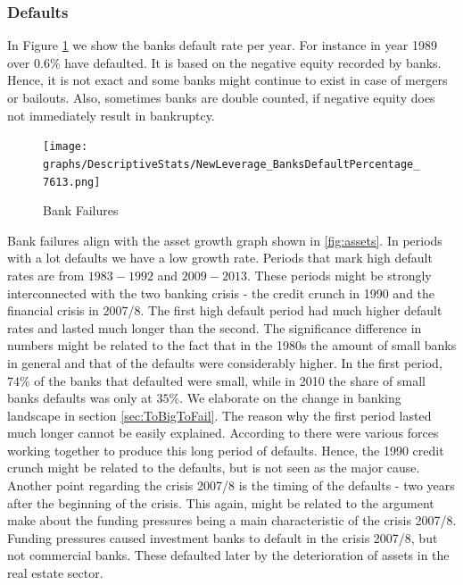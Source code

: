 \documentclass[12pt, a4paper]{article} %
\begin{document}

\subsubsection{Defaults}

In Figure \ref{fig:banks_default} we show the banks default rate per year. For instance in year 1989 over $0.6\%$ have defaulted. It is based on the negative equity recorded by banks. Hence, it is not exact and some banks might continue to exist in case of mergers or bailouts. Also, sometimes banks are double counted, if negative equity does not immediately result in bankruptcy.

\begin{figure}[H]
\texttt{[image: graphs/DescriptiveStats/NewLeverage\_BanksDefaultPercentage\_7613.png]}
\centering
\caption{Bank Failures}
\label{fig:banks_default}
\end{figure}


Bank failures align with the asset growth graph shown in \ref{fig:assets}. In periods with a lot defaults we have a low growth rate. Periods that mark high default rates are from $1983-1992$ and $2009-2013$. These periods might be strongly interconnected with the two banking crisis - the credit crunch in 1990 and the financial crisis in 2007/8. The first high default period had much higher default rates and lasted much longer than the second.
The significance difference in numbers might be related to the fact that in the 1980s the amount of small banks in general and that of the defaults were considerably higher.  In the first period, $74\%$ of the banks that defaulted were small, while in 2010 the share of small banks defaults was only at $35\%$. We elaborate on the change in banking landscape in section \ref{sec:ToBigToFail}. The reason why the first period lasted much longer cannot be easily explained. According to \citet{federal1997history} there were various forces working together to produce this long period of defaults. Hence, the 1990 credit crunch might be related to the defaults, but is not seen as the major cause.
Another point regarding the crisis 2007/8 is the timing of the defaults - two years after the beginning of the crisis. This again, might be related to the argument \cite{antoniades2019commercial} make about the funding pressures being a main characteristic of the crisis 2007/8. Funding pressures caused investment banks to default in the crisis 2007/8, but not commercial banks. These defaulted later by the deterioration of assets in the real estate sector.
\end{document}

